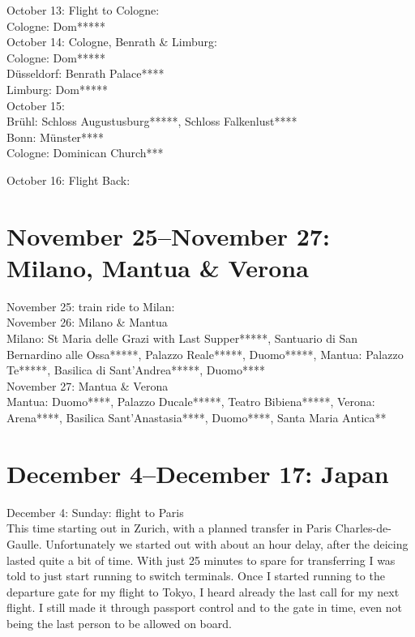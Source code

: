 October 13: Flight to Cologne:\\
Cologne: Dom*****\\

October 14: Cologne, Benrath \& Limburg:\\
Cologne: Dom*****\\
D\"usseldorf: Benrath Palace****\\
Limburg: Dom*****\\

October 15:\\
Br\"uhl: Schloss Augustusburg*****, Schloss Falkenlust****\\
Bonn: M\"unster****\\
Cologne: Dominican Church***

October 16: Flight Back:\\


\section{November 25--November 27: Milano, Mantua \& Verona}
\label{Milano2016}

November 25: train ride to Milan:\\

November 26: Milano \& Mantua\\
Milano: St Maria delle Grazi with Last Supper*****, Santuario di San Bernardino alle Ossa*****, Palazzo Reale*****, Duomo*****, Mantua: Palazzo Te*****, Basilica di Sant'Andrea*****, Duomo****\\

November 27: Mantua \& Verona\\
Mantua: Duomo****, Palazzo Ducale*****, Teatro Bibiena*****, Verona: Arena****, Basilica Sant'Anastasia****, Duomo****, Santa Maria Antica**

\section{December 4--December 17: Japan}
\label{Japan2016}

December 4: Sunday: flight to Paris\\
This time starting out in Zurich, with a planned transfer in Paris Charles-de-Gaulle. Unfortunately we started out with about an hour delay, after the deicing lasted quite a bit of time. With just 25 minutes to spare for transferring I was told to just start running to switch terminals. Once I started running to the departure gate for my flight to Tokyo, I heard already the last call for my next flight. I still made it through passport control and to the gate in time, even not being the last person to be allowed on board.\\

